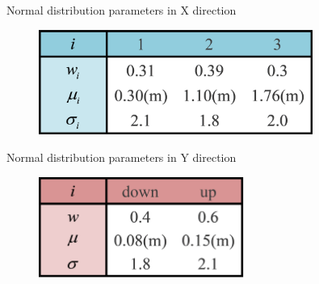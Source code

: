 \documentclass[12pt]{article}  %
\numberwithin{equation}{section} %
\begin{document}
\vspace{-3em}
\begin{minipage}[t]{0.5\linewidth}%
        \begin{table}[H]
    	    \centering
            \caption{\centering Normal distribution parameters in X direction}
            \vspace{-1em}
            \begin{figure}[H]
        	\centering
        	\includegraphics[width=0.8\textwidth]{X_TABLE.png}
        \end{figure}
        \label{X_TABLE}%
        \end{table}
    \end{minipage}%
    \begin{minipage}[t]{0.5\linewidth}%
        \begin{table}[H]
    	    \centering
            \caption{\centering Normal distribution parameters in Y direction}
            \vspace{-1em}
            \begin{figure}[H]
        	\centering
        	\includegraphics[width=0.6\textwidth]{Y_TABLE.png}
        \end{figure}
        \label{Y_TABLE}%
        \end{table}
         \vspace{-2em}
    \end{minipage}\par %
\end{document}
